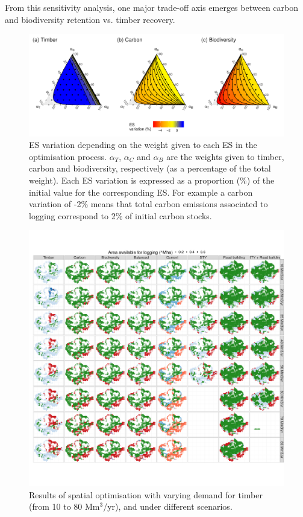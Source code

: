 \documentclass{article}
\begin{document}
From this sensitivity analysis, one major trade-off axis emerges between carbon and biodiversity retention vs. timber recovery. 

\begin{figure}
    \centering
    \includegraphics[width=\textwidth]{graphs/changingESweights.pdf}
    \caption{ES variation depending on the weight given to each ES in the optimisation process. $\alpha_T$, $\alpha_C$ and $\alpha_B$ are the weights given to timber, carbon and biodiversity, respectively (as a percentage of the total weight). Each ES variation is expressed as a proportion (\%) of the initial value for the corresponding ES. For example a carbon variation of -2\% means that total carbon emissions associated to logging correspond to 2\% of initial carbon stocks.} 
    \label{fig:changeCosts}
\end{figure}


\clearpage

\begin{figure}
    \centering
    \includegraphics[width=\linewidth]{graphs/mapsChangeDemand.pdf}
    \caption{Results of spatial optimisation with varying demand for timber (from 10 to 80 Mm$^3$/yr), and under different scenarios.}
    \label{fig:mapsIncDemand}
\end{figure}
\end{document}
